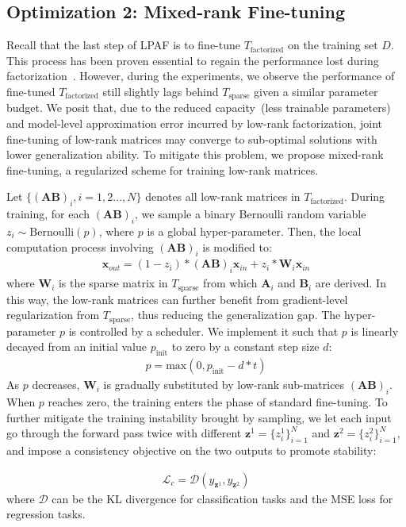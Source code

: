\subsection{Optimization 2: Mixed-rank Fine-tuning}
Recall that the last step of LPAF is to fine-tune $T_{\text{factorized}}$ on the training set $D$. This process has been proven essential to regain the performance lost during factorization~\cite{svd}. However, during the experiments, we observe the performance of fine-tuned $T_{\text{factorized}}$ still slightly lags behind $T_{\text{sparse}}$ given a similar parameter budget. 
We posit that, due to the reduced capacity~(less trainable parameters) and model-level approximation error incurred by low-rank factorization, joint fine-tuning of low-rank matrices may converge to sub-optimal solutions with lower generalization ability. To mitigate this problem, we propose mixed-rank fine-tuning, a regularized scheme for training low-rank matrices.

Let $\{(\bm{A}\bm{B})_i, i=1,2...,N\}$ denotes all low-rank matrices in $T_{\text{factorized}}$. During training, for each $(\bm{A}\bm{B})_i$, we sample a binary Bernoulli random variable $z_i\sim \text{Bernoulli}(p)$, where $p$ is a global hyper-parameter. Then, the local computation process involving $(\bm{A}\bm{B})_i$ is modified to:
\begin{align}
	\bm{x}_{out} = (1-z_i)*(\bm{A}\bm{B})_i \bm{x}_{in} + z_i * \bm{W}_i\bm{x}_{in} 
\end{align}
where $\bm{W}_i$ is the sparse matrix in $T_{\text{sparse}}$ from which $\bm{A}_i$ and $\bm{B}_i$ are derived. In this way, the low-rank matrices can further 
benefit from gradient-level regularization from  $T_{\text{sparse}}$, 
thus reducing the generalization gap. The hyper-parameter $p$ is controlled by a scheduler. We implement it such that $p$ is linearly decayed from an initial value $p_{\text{init}}$ to zero by a constant step size $d$:
\begin{align}
	p = \text{max}(0, p_{\text{init}}-d*t)
\end{align}
As $p$ decreases, $\bm{W}_i$ is gradually substituted by low-rank sub-matrices $(\bm{AB})_i$. When $p$ reaches zero, the training enters the phase of standard fine-tuning. To further mitigate the training instability brought by sampling, we let each input go through the forward pass twice with different $\bm{z}^1=\{z_i^1\}_{i=1}^{N}$ and $\bm{z}^2=\{z_i^2\}_{i=1}^{N}$, and impose a consistency objective on the two outputs to promote stability:

\begin{align}
	\mathcal{L}_{c}=\mathcal{D}(y_{\bm{z}^1}, y_{\bm{z}^2})
\end{align}
where $\mathcal{D}$ can be the KL divergence for classification tasks and the MSE loss for regression tasks.

